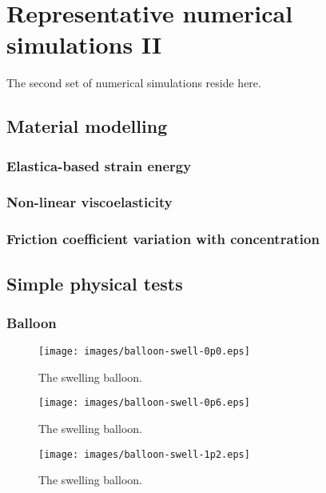 \chapter{Representative numerical simulations II}
\label{numerical-simulations-2}

The second set of numerical simulations reside here.

\section{Material modelling}
\label{material-modelling}

\subsection{Elastica-based strain energy}
\label{elastica-stain-energy}

\subsection{Non-linear viscoelasticity}
\label{non-linear-viscoelasticity}

\subsection{Friction coefficient variation with concentration}
\label{variable-friction-coefficient}

\section{Simple physical tests}
\label{simple-physics}

\subsection{Balloon}
\label{balloon}

\begin{figure}
\centering
{\texttt{[image: images/balloon-swell-0p0.eps]}}
\caption{The swelling balloon.} 
\label{swelling-balloon-image-0}
\end{figure}

\begin{figure}
\centering
{\texttt{[image: images/balloon-swell-0p6.eps]}}
\caption{The swelling balloon.} 
\label{swelling-balloon-image-1}
\end{figure}

\begin{figure}
\centering
{\texttt{[image: images/balloon-swell-1p2.eps]}}
\caption{The swelling balloon.} 
\label{swelling-balloon-image-2}
\end{figure}

